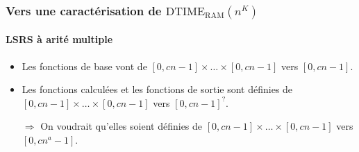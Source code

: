 \documentclass[10pt]{beamer}
\newcommand{\dtimeram}{\text{DTIME}_{\text{RAM}}\left( n^K \right)}
\begin{document}
\begin{frame}
		
		
	\end{frame}
	
	
	
	
	\begin{frame}
		\frametitle{Vers une caractérisation de $\dtimeram$}
		\framesubtitle{LSRS à arité multiple}
		
		
		\begin{itemize}
			\item 	Les fonctions de base vont de $[0, c n-1] \times \dots \times [0, c n-1]$ vers $[0, c n-1]$. %
			\item 	Les fonctions calculées et les fonctions de sortie sont définies de $[0, c n-1] \times \dots \times [0, c n-1]$ vers $[0, c n-1]^{?}$.
			\pause 
			\item[$\Rightarrow$] On voudrait qu'elles soient définies de $[0, c n-1] \times \dots \times [0, c n-1]$ vers $[0, c n^a-1]$.
		\end{itemize}
	\end{frame}
	
	
\end{document}
